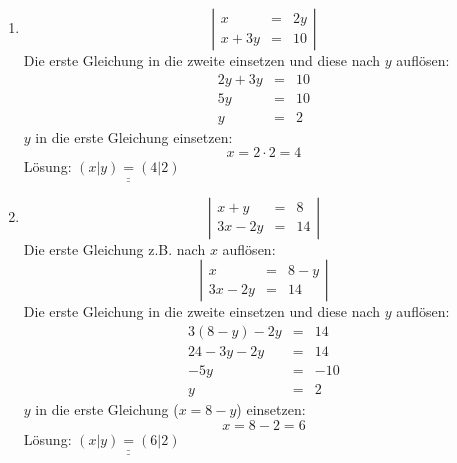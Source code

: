 \documentclass[%
11pt,%
twoside,%
titlepage,%
german,%
]{scrartcl}
\newcommand{\result}[1]{\underline{\underline{#1}}}
\begin{document}
\begin{enumerate}
\begin{enumerate}
  \item 
    \begin{displaymath}
      \left| 
        \begin{array}{rcl}
          x & = & 2y \\
          x+3y & = & 10
        \end{array} \right|
    \end{displaymath}
    Die erste Gleichung in die zweite einsetzen und diese nach $y$ aufl\"osen:
    \begin{eqnarray*}
      2y + 3y & = & 10 \\
      5y & = & 10 \\
      y & = & 2
    \end{eqnarray*}
    $y$ in die erste Gleichung einsetzen:
    \begin{displaymath}
      x = 2 \cdot 2 = 4
    \end{displaymath}
    L\"osung: $\result{(x|y)=(4|2)}$

  \item 
    \begin{displaymath}
      \left| 
        \begin{array}{rcl}
          x+y & = & 8 \\
        3x-2y & = & 14
      \end{array} \right|
  \end{displaymath}
  Die erste Gleichung z.B. nach $x$ aufl\"osen:
  \begin{displaymath}
    \left| 
      \begin{array}{rcl}
        x & = & 8-y \\
        3x-2y & = & 14
      \end{array} \right|
  \end{displaymath}
  Die erste Gleichung in die zweite einsetzen und diese nach $y$ aufl\"osen:
  \begin{eqnarray*}
    3(8-y)-2y & = & 14 \\
    24-3y-2y & = & 14 \\
    -5y & = & -10 \\
    y & = & 2
  \end{eqnarray*}
    $y$ in die erste Gleichung ($x=8-y$) einsetzen:
    \begin{displaymath}
      x = 8-2 = 6
    \end{displaymath}
    L\"osung: $\result{(x|y)=(6|2)}$
    

\end{enumerate}
\end{enumerate}
\end{document}
